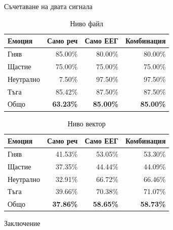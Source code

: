 \documentclass[9pt]{beamer}
\begin{document}
    \begin{frame}[t]{Съчетаване на двата сигнала}
        \begin{table}[h]
        \pause
        \begin{center}
            \begin{tabular}{|l|r r r|}
                \hline
                Емоция    & Само реч         & Само ЕЕГ         & Комбинация     \\
                \hline
                Гняв      & 85.00\%          & 80.00\%          & 80.00\%          \\
                Щастие    & 75.00\%          & 75.00\%          & 75.00\%          \\
                Неутрално & 7.50\%           & 97.50\%          & 97.50\%          \\
                Тъга      & 85.42\%          & 87.50\%          & 87.50\%          \\
                \hline
                \hline
                Общо      & \textbf{63.23\%} & \textbf{85.00\%} & \textbf{85.00\%} \\
                \hline
            \end{tabular}
            \caption*{Ниво файл}
        \end{center}
        \end{table}
        \pause
        \begin{table}[h]
            \begin{center}
                \begin{tabular}{|l|r r r|}
                    \hline
                    Емоция    & Само реч         & Само ЕЕГ         & Комбинация     \\
                    \hline
                    Гняв      & 41.53\%          & 53.05\%          & 53.30\%          \\
                    Щастие    & 37.35\%          & 44.44\%          & 44.09\%          \\
                    Неутрално & 32.91\%           & 66.72\%          & 66.46\%          \\
                    Тъга      & 39.66\%          & 70.38\%          & 71.07\%          \\
                    \hline
                    \hline
                    Общо      & \textbf{37.86\%} & \textbf{58.65\%} & \textbf{58.73\%} \\
                    \hline
                \end{tabular}
                \caption*{Ниво вектор}
            \end{center}
        \end{table}
    \end{frame}
    \begin{frame}[t]{Заключение}
        \pause
    \end{frame}
\end{document}
